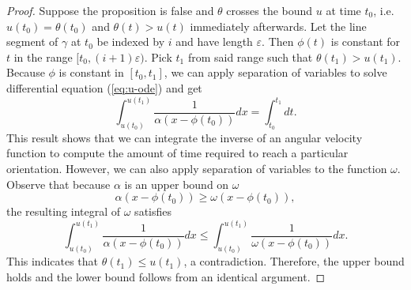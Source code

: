 \documentclass[conference]{IEEEtran}
\newtheorem{proposition}{Proposition}
\begin{document}
\begin{proof}
  Suppose the proposition is false and $\theta$ crosses the bound $u$
  at time $t_0$, i.e. $u(t_0)=\theta(t_0)$ and $\theta(t) > u(t)$
  immediately afterwards. Let the line segment of $\gamma$ at $t_0$ be
  indexed by $i$ and have length $\varepsilon$. Then $\phi(t)$ is
  constant for $t$ in the range $[t_0,(i+1)\varepsilon)$. Pick $t_1$
  from said range such that $\theta(t_1) > u(t_1)$. Because $\phi$ is
  constant in $[t_0,t_1]$, we can apply separation of variables to
  solve differential equation (\ref{eq:u-ode}) and get
  \begin{equation}
    \int_{u(t_0)}^{u(t_1)}\frac{1}{\alpha(x - \phi(t_0))}dx = \int_{t_0}^{t_1}dt.
  \end{equation}
  This result shows that we can integrate the inverse of an angular
  velocity function to compute the amount of time required to reach a
  particular orientation. However, we can also apply separation of
  variables to the function $\omega$. Observe that because $\alpha$ is
  an upper bound on $\omega$
  \begin{equation} 
    \alpha(x - \phi(t_0)) \geq \omega(x - \phi(t_0)),
  \end{equation}
  the resulting integral of $\omega$ satisfies
  \begin{equation}
    \int_{u(t_0)}^{u(t_1)}\frac{1}{\alpha(x - \phi(t_0))}dx \leq \int_{u(t_0)}^{u(t_1)}\frac{1}{\omega(x - \phi(t_0))}dx.
  \end{equation}
  This indicates that $\theta(t_1) \leq u(t_1)$, a
  contradiction. Therefore, the upper bound holds and the lower bound
  follows from an identical argument.
\end{proof}

\end{document}
